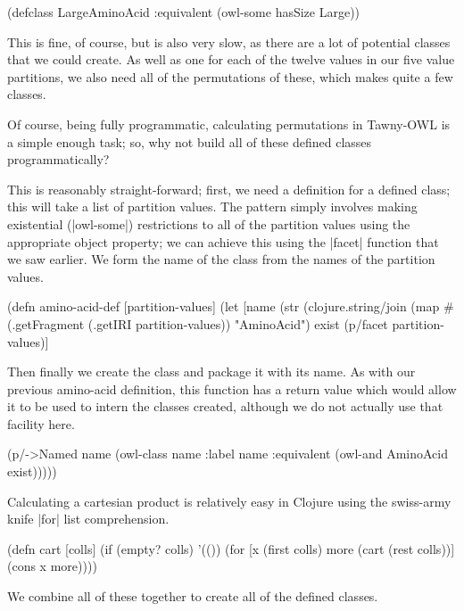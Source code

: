 \begin{tawnyexample}
(defclass LargeAminoAcid
  :equivalent (owl-some hasSize Large))
\end{tawnyexample}

This is fine, of course, but is also very slow, as there are a lot of
potential classes that we could create. As well as one for each of the twelve
values in our five value partitions, we also need all of the permutations of
these, which makes quite a few classes.

Of course, being fully programmatic, calculating permutations in Tawny-OWL is
a simple enough task; so, why not build all of these defined classes
programmatically?

This is reasonably straight-forward; first, we need a definition for a
defined class; this will take a list of partition values. The pattern
simply involves making existential (|owl-some|) restrictions to all of
the partition values using the appropriate object property; we can
achieve this using the |facet| function that we saw earlier. We form
the name of the class from the names of the partition values.

\begin{tawny}
(defn amino-acid-def [partition-values]
  (let [name
        (str
         (clojure.string/join
          (map
           #(.getFragment
             (.getIRI %
           partition-values))
         "AminoAcid")
        exist (p/facet partition-values)]
\end{tawny}

Then finally we create the class and package it with its name. As with our
previous amino-acid definition, this function has a return value which would
allow it to be used to intern the classes created, although we do not actually
use that facility here.

\begin{tawny}
    (p/->Named
     name
     (owl-class
      name
      :label name
      :equivalent
      (owl-and AminoAcid exist)))))
\end{tawny}

Calculating a cartesian product is relatively easy in Clojure using the
swiss-army knife |for| list comprehension.

\begin{tawny}
(defn cart [colls]
  (if (empty? colls)
    '(())
    (for [x (first colls)
          more (cart (rest colls))]
      (cons x more))))
\end{tawny}

We combine all of these together to create all of the defined classes.


